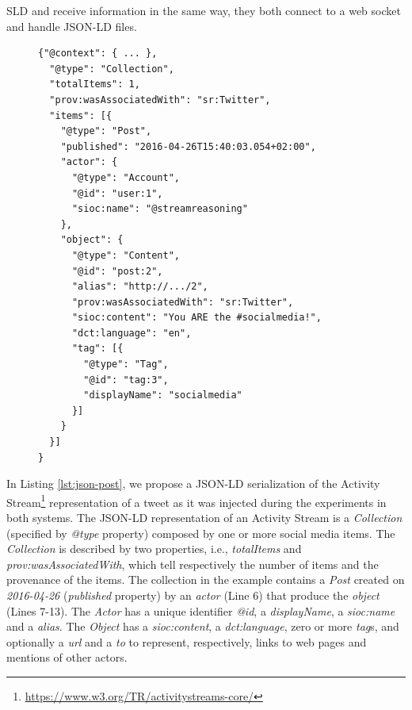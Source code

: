 {SLD and \sti{} receive information in the same way, they both connect to a web socket and handle JSON-LD files. 

\begin{figure}[ht]
\begin{minipage}{0.95\linewidth}
\begin{lstlisting}[caption={JSON representation of a Twitter micro-post. Due to the lack of space we omitted the context declaration that contains the namespace.},label=lst:json-post, style=JSON]
{"@context": { ... }, 
  "@type": "Collection",
  "totalItems": 1,
  "prov:wasAssociatedWith": "sr:Twitter",
  "items": [{
    "@type": "Post",
    "published": "2016-04-26T15:40:03.054+02:00",
    "actor": {
      "@type": "Account",
      "@id": "user:1",
      "sioc:name": "@streamreasoning"
    },
    "object": {
      "@type": "Content",
      "@id": "post:2",
      "alias": "http://.../2",
      "prov:wasAssociatedWith": "sr:Twitter",
      "sioc:content": "You ARE the #socialmedia!",
      "dct:language": "en",
      "tag": [{
        "@type": "Tag",
        "@id": "tag:3",
        "displayName": "socialmedia"
      }]
    }
  }]
}
\end{lstlisting}
\end{minipage}
\end{figure}

In Listing \ref{lst:json-post}, we propose a JSON-LD serialization of the Activity Stream\footnote{\url{https://www.w3.org/TR/activitystreams-core/}} representation of a tweet as it was injected during the experiments in both systems.  
The JSON-LD representation of an Activity Stream is a \textit{Collection} (specified by \textit{@type} property) composed by one or more social media items. The \textit{Collection} is described by two properties, i.e., \textit{totalItems} and \textit{prov:wasAssociatedWith}, which tell respectively the number of items and the provenance of the items. The collection in the example contains a \textit{Post} created on \textit{2016-04-26} (\textit{published} property) by  an \textit{actor} (Line 6) that produce the \textit{object} (Lines 7-13). 
The \textit{Actor} has a unique identifier  \textit{@id}, a \textit{displayName}, a \textit{sioc:name} and a \textit{alias}. The \textit{Object} has a \textit{sioc:content}, a \textit{dct:language}, zero or more \textit{tag}s, and optionally a \textit{url} and a \textit{to} to represent, respectively, links to web pages and mentions of other actors.

}
